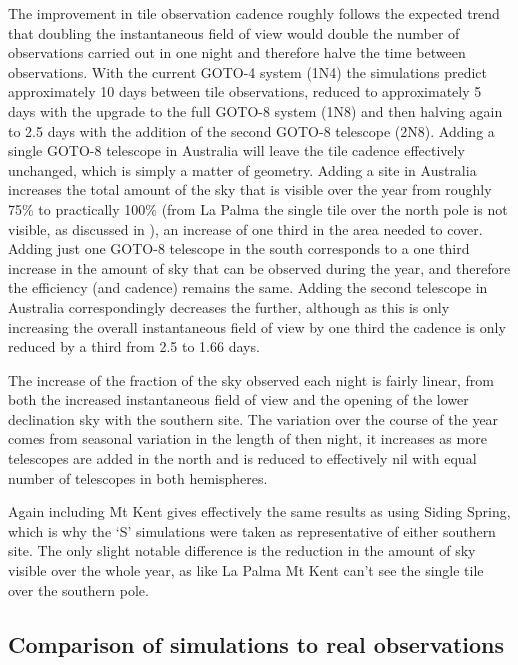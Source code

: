 \begin{colsection}
\begin{colsection}
The improvement in tile observation cadence roughly follows the expected trend that doubling the instantaneous field of view would double the number of observations carried out in one night and therefore halve the time between observations. With the current GOTO-4 system (1N4) the simulations predict approximately 10 days between tile observations, reduced to approximately 5 days with the upgrade to the full GOTO-8 system (1N8) and then halving again to 2.5 days with the addition of the second GOTO-8 telescope (2N8). Adding a single GOTO-8 telescope in Australia will leave the tile cadence effectively unchanged, which is simply a matter of geometry. Adding a site in Australia increases the total amount of the sky that is visible over the year from roughly 75\% to practically 100\% (from La Palma the single tile over the north pole is not visible, as discussed in ), an increase of one third in the area needed to cover. Adding just one GOTO-8 telescope in the south corresponds to a one third increase in the amount of sky that can be observed during the year, and therefore the efficiency (and cadence) remains the same. Adding the second telescope in Australia correspondingly decreases the further, although as this is only increasing the overall instantaneous field of view by one third the cadence is only reduced by a third from 2.5 to 1.66 days.

The increase of the fraction of the sky observed each night is fairly linear, from both the increased instantaneous field of view and the opening of the lower declination sky with the southern site. The variation over the course of the year comes from seasonal variation in the length of then night, it increases as more telescopes are added in the north and is reduced to effectively nil with equal number of telescopes in both hemispheres.

Again including Mt Kent gives effectively the same results as using Siding Spring, which is why the `S' simulations were taken as representative of either southern site. The only slight notable difference is the reduction in the amount of sky visible over the whole year, as like La Palma Mt Kent can't see the single tile over the southern pole.

\end{colsection}


\subsection{Comparison of simulations to real observations}
\label{sec:survey_sim_150}
\begin{colsection}


\end{colsection}
\end{colsection}
